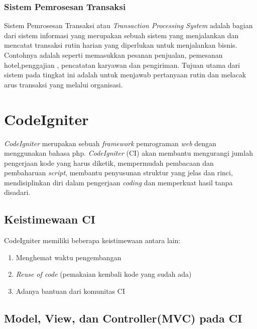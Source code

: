 		\subsubsection{Sistem Pemrosesan Transaksi}
		\label{subsub: sistemPemrosesanTransaksi}
		
		Sistem Pemrosesan Transaksi atau \textit{Transaction Processing System} adalah bagian dari sistem informasi yang merupakan sebuah sistem yang menjalankan dan mencatat transaksi rutin harian yang diperlukan untuk menjalankan bisnis. Contohnya adalah seperti memasukkan pesanan penjualan, pemesanan hotel,penggajian , pencatatan karyawan dan pengiriman. Tujuan utama dari sistem pada tingkat ini adalah untuk menjawab pertanyaan rutin dan melacak arus transaksi yang melalui organisasi.
		
\section{CodeIgniter}
\label{sec: codeigniter}

	\textit{CodeIgniter} merupakan sebuah \textit{framework} pemrograman \textit{web} dengan menggunakan bahasa php. \textit{CodeIgniter} (CI) akan membantu mengurangi jumlah pengerjaan kode yang harus diketik, mempermudah pembacaan dan pembaharuan \textit{script}, membantu penyusunan struktur yang jelas dan rinci, mendisiplinkan diri dalam pengerjaan \textit{coding} dan memperkuat hasil tanpa disadari.
	
	
	\subsection{Keistimewaan CI}
	\label{sub: KeistimewaanCI}
	CodeIgniter memiliki beberapa keistimewaan antara lain:
	\begin{enumerate}
		\item Menghemat waktu pengembangan
		\item \textit{Reuse of code} (pemakaian kembali kode yang sudah ada)
		\item Adanya bantuan dari komunitas CI
	\end{enumerate}	
	
	
	\subsection{Model, View, dan Controller(MVC) pada CI}
	\label{sub: mvc}
	

